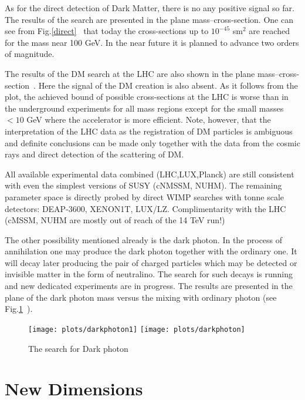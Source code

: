 \documentclass{cernyrep}
\begin{document}
As for the direct detection of Dark Matter, there is  no any positive signal so far. The results of the search are presented in the plane  mass--cross-section. One can see from Fig.\ref{direct}~\cite{direct} that today the cross-sections up to $10^{-45}$ sm$^2$ are reached for the mass near 100 GeV.  In the near future it is planned to advance  two orders of magnitude.

The results of the DM search at the LHC are also shown in the plane mass--cross-section~\cite{LHCDM}. Here the signal of the DM creation is also absent. As it follows from the plot, the achieved bound of possible cross-sections at the LHC  is worse than in  the underground experiments for all mass regions except for the small masses $<10$ GeV where the accelerator is more efficient. Note, however, that the interpretation of the LHC data as the registration of DM particles is ambiguous and definite conclusions can be made only together with the data from the cosmic rays and direct detection of the scattering of  DM. 


All available experimental data combined (LHC,LUX,Planck) are still consistent with even the simplest versions of SUSY (cNMSSM, NUHM).  The remaining parameter space is directly probed by direct WIMP searches with tonne scale detectors: DEAP-3600, XENON1T, LUX/LZ.  Complimentarity with the LHC (cMSSM, NUHM are mostly out of reach of the 14 TeV run!)

The other possibility mentioned already is the dark photon. In the process of annihilation one may produce the dark photon together with the ordinary one. It will decay later producing the  pair of charged particles which may be detected or invisible matter in the form of neutralino. The search for such decays is running and new dedicated experiments are in progress. The results are presented in the plane  of the dark photon mass versus the mixing with ordinary photon (see Fig.\ref{dphoton}~\cite{1705}).

\begin{figure}[htb]
\begin{center}
\leavevmode
\texttt{[image: plots/darkphoton1]}\hspace{1cm}
\texttt{[image: plots/darkphoton]}
\end{center}\caption{The search for Dark photon}
\label{dphoton}
\end{figure}

\section{New Dimensions}
\end{document}
